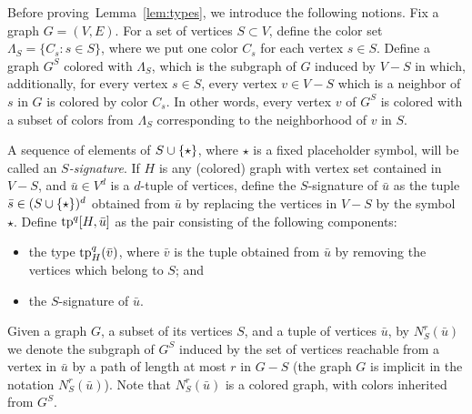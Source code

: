Before proving~Lemma~\ref{lem:types}, we introduce the following notions.
Fix a graph $G=(V,E)$.
For a set of vertices $S\subset V$, define the color set $\Lambda_S=\{C_s\colon s\in S\}$, where we put one color $C_s$ for each vertex $s\in S$.
Define a graph $G^S$ colored with $\Lambda_S$, which is 
the subgraph of $G$ induced by $V-S$
in which, additionally, for every vertex $s\in S$, every vertex $v\in V-S$ which is a neighbor of $s$ in $G$ is colored by color $C_s$. 
In other words, every vertex $v$ of $G^S$ is colored with a subset of colors from $\Lambda_S$ corresponding to the neighborhood of $v$ in $S$.

A sequence of elements of $S\cup\{\star\}$,
where $\star$ is a fixed placeholder symbol,
will be called an \emph{$S$-signature}.
If $H$ is any (colored) graph with vertex set contained in $V-S$,
and $\bar u\in V^d$ is a $d$-tuple of vertices,
define the {$S$-signature} of $\bar u$
as the tuple $\bar s\in (S\cup\{\star\})^d$ obtained from $\bar u$ by replacing the vertices in $V-S$ by the symbol~$\star$.
Define $\mathrm{tp}^q[H,\bar u]$ as the
pair consisting of the following components:
\begin{itemize}
	\item the type $\mathrm{tp}^q_H(\bar v)$,
	where $\bar v$ is the tuple obtained from $\bar u$
	by removing the vertices which belong to $S$; and
	\item the $S$-signature of $\bar u$.
\end{itemize}

Given a graph $G$, a subset of its vertices $S$, and a tuple of vertices $\bar u$,
by $N^r_S(\bar u)$ we denote the subgraph of $G^S$ induced by the set of vertices reachable from a vertex in $\bar u$ by a path of length at most $r$
in $G-S$ (the graph $G$ is implicit in the notation $N^r_S(\bar u)$). Note that $N^r_S(\bar u)$ is a colored graph, with colors inherited from $G^S$.

